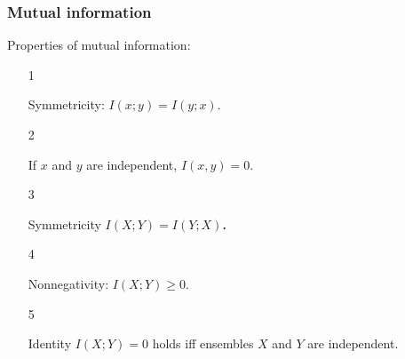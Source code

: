 \documentclass[14pt]{beamer}
\begin{document}
\begin{frame}
\frametitle{Mutual information}
Properties of mutual information:

\begin{enumerate}

    \item[1]
    \begin{prop} \label{p5_1}
    Symmetricity: $I(x;y) = I(y;x)$.
    \end{prop}

    \pause \item[2]
    \begin{prop} \label{p5_2}
    If $x$ and $y$ are independent, $I(x,y) = 0$.
    \end{prop}

    \pause \item[3]
    \begin{prop} \label{p5_3}
    Symmetricity $I(X;Y) = I(Y;X)$\textbf{.}
    \end{prop}

    \pause \item[4]
    \begin{prop} \label{p5_4}
    Nonnegativity: $I(X;Y) \ge 0$.
    \end{prop}

    \pause \item[5]
    \begin{prop} \label{p5_5}
    Identity $I(X;Y) = 0$ holds iff  ensembles $X$ and $Y$ are independent.
    \end{prop}


\end{enumerate}
\end{frame}
\end{document}
